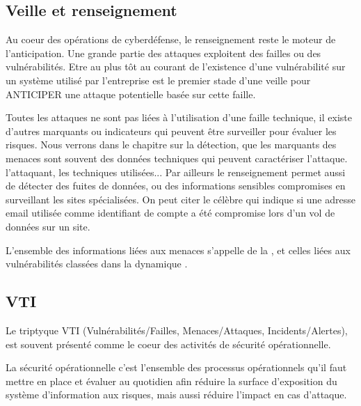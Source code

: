 \subsection{Veille et renseignement}

Au coeur des opérations de cyberdéfense, le renseignement reste le moteur de l'anticipation.  Une grande partie des attaques exploitent des failles ou des vulnérabilités. Etre au plus tôt au courant de l'existence d'une vulnérabilité sur un système utilisé par l'entreprise est le premier stade d'une veille pour ANTICIPER une attaque potentielle basée sur cette faille.

Toutes les attaques ne sont pas liées à l'utilisation d'une faille technique, il existe d'autres marquants ou indicateurs qui peuvent être surveiller pour évaluer les risques. Nous verrons dans le chapitre sur la détection, que les marquants des menaces sont souvent des données techniques qui peuvent caractériser l'attaque. l'attaquant, les techniques utilisées...
Par ailleurs le renseignement permet aussi de détecter des fuites de données, ou des informations sensibles compromises en surveillant les sites spécialisées.
On peut citer le célèbre \textbf{} qui indique si une adresse email utilisée comme identifiant de compte a été compromise lors d'un vol de données sur un site. 

L'ensemble des informations liées aux menaces s'appelle de la , et celles liées aux vulnérabilités  classées dans la dynamique .


\subsection{VTI}


Le triptyque VTI (Vulnérabilités/Failles, Menaces/Attaques, Incidents/Alertes), est souvent présenté comme le coeur des activités de sécurité opérationnelle. 

La sécurité opérationnelle c’est l’ensemble des processus opérationnels qu’il faut mettre en place et évaluer au quotidien afin réduire la surface d’exposition du système d’information aux risques, mais aussi réduire l'impact en cas d'attaque. 

